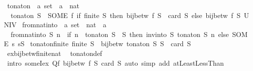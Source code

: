 \begin{isabellebody}
\ to{\isacharunderscore}nat{\isacharunderscore}on\ {\isacharcolon}{\isacharcolon}\ {\isachardoublequoteopen}{\isacharprime}a\ set\ {\isasymRightarrow}\ {\isacharprime}a\ {\isasymRightarrow}\ nat{\isachardoublequoteclose}\ \isanewline
\ \ {\isachardoublequoteopen}to{\isacharunderscore}nat{\isacharunderscore}on\ S\ {\isacharequal}\ {\isacharparenleft}SOME\ f{\isachardot}\ if\ finite\ S\ then\ bij{\isacharunderscore}betw\ f\ S\ {\isacharbraceleft}{\isachardot}{\isachardot}{\isacharless}\ card\ S{\isacharbraceright}\ else\ bij{\isacharunderscore}betw\ f\ S\ UNIV{\isacharparenright}{\isachardoublequoteclose}\isanewline
\isanewline
{}\isamarkupfalse%
\ from{\isacharunderscore}nat{\isacharunderscore}into\ {\isacharcolon}{\isacharcolon}\ {\isachardoublequoteopen}{\isacharprime}a\ set\ {\isasymRightarrow}\ nat\ {\isasymRightarrow}\ {\isacharprime}a{\isachardoublequoteclose}\ \isanewline
\ \ {\isachardoublequoteopen}from{\isacharunderscore}nat{\isacharunderscore}into\ S\ n\ {\isacharequal}\ {\isacharparenleft}if\ n\ {\isasymin}\ to{\isacharunderscore}nat{\isacharunderscore}on\ S\ {\isacharbackquote}\ S\ then\ inv{\isacharunderscore}into\ S\ {\isacharparenleft}to{\isacharunderscore}nat{\isacharunderscore}on\ S{\isacharparenright}\ n\ else\ SOME\ s{\isachardot}\ s{\isasymin}S{\isacharparenright}{\isachardoublequoteclose}\isanewline
\isanewline
{}\isamarkupfalse%
\ to{\isacharunderscore}nat{\isacharunderscore}on{\isacharunderscore}finite{\isacharcolon}\ {\isachardoublequoteopen}finite\ S\ {\isasymLongrightarrow}\ bij{\isacharunderscore}betw\ {\isacharparenleft}to{\isacharunderscore}nat{\isacharunderscore}on\ S{\isacharparenright}\ S\ {\isacharbraceleft}{\isachardot}{\isachardot}{\isacharless}\ card\ S{\isacharbraceright}{\isachardoublequoteclose}\isanewline
%
\isadelimproof
\ \ %
\endisadelimproof
%
\isatagproof
{}\isamarkupfalse%
\ ex{\isacharunderscore}bij{\isacharunderscore}betw{\isacharunderscore}finite{\isacharunderscore}nat\ \isamarkupfalse%
\ to{\isacharunderscore}nat{\isacharunderscore}on{\isacharunderscore}def\isanewline
\ \ \isamarkupfalse%
\ {\isacharparenleft}intro\ someI{}{\isacharunderscore}ex{\isacharbrackleft}\ Q{\isacharequal}{\isachardoublequoteopen}{\isasymlambda}f{\isachardot}\ bij{\isacharunderscore}betw\ f\ S\ {\isacharbraceleft}{\isachardot}{\isachardot}{\isacharless}card\ S{\isacharbraceright}{\isachardoublequoteclose}{\isacharbrackright}{\isacharparenright}\ {\isacharparenleft}auto\ simp\ add{\isacharcolon}\ atLeast{}LessThan{\isacharparenright}%

\end{isabellebody}
